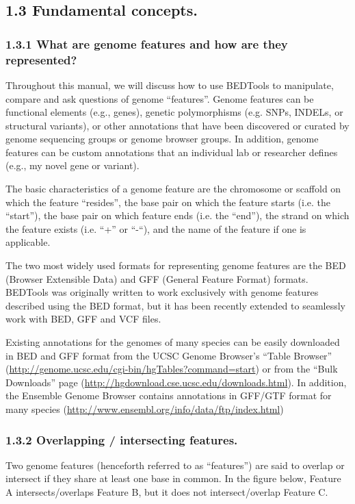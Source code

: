 \documentclass[letterpaper,10pt,english]{sphinxmanual}
\begin{document}
\subsection{1.3 Fundamental concepts.}
\label{content/overview:fundamental-concepts}

\subsubsection{1.3.1 What are genome features and how are they represented?}
\label{content/overview:what-are-genome-features-and-how-are-they-represented}
Throughout this manual, we will discuss how to use BEDTools to manipulate, compare and ask questions of genome “features”. Genome features can be functional elements (e.g., genes), genetic polymorphisms (e.g.
SNPs, INDELs, or structural variants), or other annotations that have been discovered or curated by genome sequencing groups or genome browser groups. In addition, genome features can be custom annotations that
an individual lab or researcher defines (e.g., my novel gene or variant).

The basic characteristics of a genome feature are the chromosome or scaffold on which the feature “resides”, the base pair on which the
feature starts (i.e. the “start”), the base pair on which feature ends (i.e. the “end”), the strand on which the feature exists (i.e. “+” or “-“), and the name of the feature if one is applicable.

The two most widely used formats for representing genome features are the BED (Browser Extensible Data) and GFF (General Feature Format) formats. BEDTools was originally written to work exclusively with genome features
described using the BED format, but it has been recently extended to seamlessly work with BED, GFF and VCF files.

Existing annotations for the genomes of many species can be easily downloaded in BED and GFF
format from the UCSC Genome Browser’s “Table Browser” (\href{http://genome.ucsc.edu/cgi-bin/hgTables?command=start}{http://genome.ucsc.edu/cgi-bin/hgTables?command=start}) or from the “Bulk Downloads” page (\href{http://hgdownload.cse.ucsc.edu/downloads.html}{http://hgdownload.cse.ucsc.edu/downloads.html}). In addition, the
Ensemble Genome Browser contains annotations in GFF/GTF format for many species (\href{http://www.ensembl.org/info/data/ftp/index.html}{http://www.ensembl.org/info/data/ftp/index.html})


\subsubsection{1.3.2 Overlapping / intersecting features.}
\label{content/overview:overlapping-intersecting-features}
Two genome features (henceforth referred to as “features”) are said to overlap or intersect if they share at least one base in common.
In the figure below, Feature A intersects/overlaps Feature B, but it does not intersect/overlap Feature C.
\end{document}
